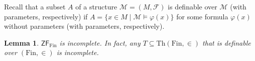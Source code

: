 \documentclass[a4paper, 11pt]{amsart}
\newtheorem{lemma}[lemma]{Lemma}
\theoremstyle{remark}
\newcommand{\axiomft}[1]{\mathsf{#1}}
\newcommand{\ZF}{\axiomft{ZF}}
\newcommand{\Th}{\mathrm{Th}}
\newcommand{\Fin}{\mathrm{Fin}}
\newcommand{\cF}{\mathcal F}
\newcommand{\cM}{\mathcal M}
\begin{document}
Recall that a subset $A$ of a structure $\cM = (M,\cF)$ is definable over $\cM$ (with parameters, respectively) if $A=\{x\in M \mid \cM \models \varphi(x)\}$ for some formula $\varphi(x)$ without parameters (with parameters, respectively). 


\begin{lemma} 
\label{ZFfin is incomplete} 
$\ZF_\Fin$ is incomplete. 
In fact, any $T\subseteq \Th(\Fin,\in)$ that is definable over $(\Fin,\in)$ is incomplete. 
\end{lemma} 
\end{document}
